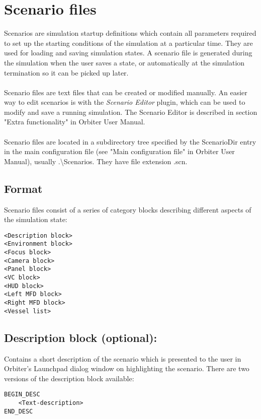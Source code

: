 \documentclass[Orbiter Developer Manual.tex]{subfiles}
\begin{document}
\section{Scenario files}
\label{sec:scn_files}
Scenarios are simulation startup definitions which contain all parameters required to set up the starting conditions of the simulation at a particular time. They are used for loading and saving simulation states. A scenario file is generated during the simulation when the user saves a state, or automatically at the simulation termination so it can be picked up later.\\
\\
Scenario files are text files that can be created or modified manually. An easier way to edit scenarios is with the \textit{Scenario Editor} plugin, which can be used to modify and save a running simulation. The Scenario Editor is described in section "Extra functionality" in Orbiter User Manual.\\
\\
Scenario files are located in a subdirectory tree specified by the ScenarioDir entry in the main configuration file (see "Main configuration file" in Orbiter User Manual), usually .\textbackslash Scenarios. They have file extension .scn.


\subsection*{Format}
Scenario files consist of a series of category blocks describing different aspects of the simulation state:

\begin{lstlisting}[language=OSFS]
<Description block>
<Environment block>
<Focus block>
<Camera block>
<Panel block>
<VC block>
<HUD block>
<Left MFD block>
<Right MFD block>
<Vessel list>
\end{lstlisting}


\subsection*{Description block (optional):}
Contains a short description of the scenario which is presented to the user in Orbiter's Launchpad dialog window on highlighting the scenario. There are two versions of the description block available:

\begin{lstlisting}[language=OSFS]
BEGIN_DESC
	<Text-description>
END_DESC
\end{lstlisting}
\end{document}
